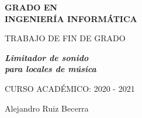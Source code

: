 \begin{center}
\vspace*{1cm}
\par\end{center}

\begin{center}
\textbf{\large GRADO EN}\\
\textbf{\large INGENIERÍA INFORMÁTICA}
\par\end{center}{\large \par}

\begin{center}
{\large TRABAJO DE FIN DE GRADO}

\par\end{center}{\large \par}

\begin{center}
\par\end{center}

\begin{center}
\textbf{\emph{\LARGE {Limitador de sonido}}} \\
\textbf{\emph{\LARGE {para locales de música}}}
\par\end{center}{\LARGE \par}

\begin{center}
\vspace*{3cm}
\par\end{center}

\begin{center}
{\large CURSO ACADÉMICO: 2020 - 2021}
\par\end{center}{\large \par}

\begin{center}
{\large Alejandro Ruiz Becerra}
\par\end{center}{\large \par}

\newpage
\thispagestyle{empty}

~

\newpage
\thispagestyle{empty}

